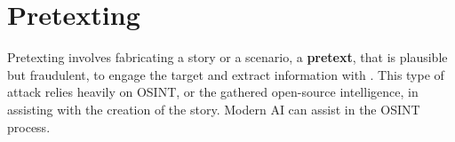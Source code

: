 \section{Pretexting}
\begin{comment}

    - General info about what is pretexting
    - Fabricated scenario that is plausible but fraudulent
    - Originally used by FBI
    - Impersonation
    - Discussion about how modern AI can aid with pretexting is in the final chapter
    - Role in the deception-based SE attacks
    - Common pretexting tactics will be covered later
    - How AI powers up pretexting will be discussed later
        - How AI tech can be utilized to create more sophisticated and convincing pretexts
        - Examples of succesful pretexting attacks and their impacts
        - AI and automated pretexting attacks and their effectiveness
        - Analysis on pretexting evolving landscape with AI
    - Ethical considerations?
    - Countermeasures will be covered later also
        - How to identify and mitigate attempts
        - Recommendations for organiations to enhance their defenses against pretexting attacks
        
\end{comment}

Pretexting involves fabricating a story or a scenario, a \textbf{pretext}, that is plausible but fraudulent, to engage the target and extract information with \citep{conteh_cybersecurityrisks_2016}. This type of attack relies heavily on OSINT, or the gathered open-source intelligence, in assisting with the creation of the story. Modern AI can assist in the OSINT process.
